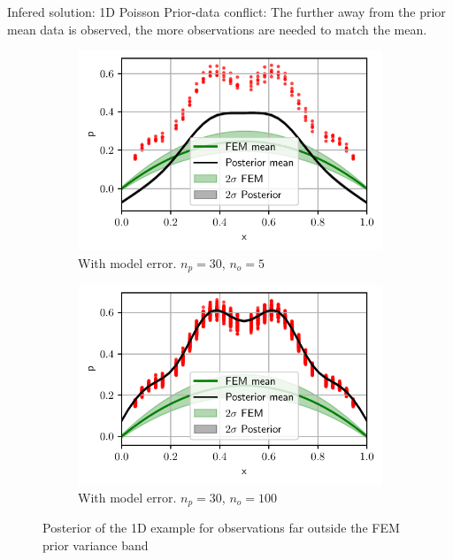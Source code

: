 \documentclass[fleqn,11pt,aspectratio=43]{beamer}
\begin{document}
	
\begin{frame}{Infered solution: 1D Poisson}
Prior-data conflict: The further away from the prior mean data is observed, the more observations are needed to match the mean.
\begin{figure}[!ht]
\centering
	\begin{subfigure}[t]{.5\textwidth}
	\centering
	\includegraphics[width=1\linewidth]{../../Python/Results/1D/PriorDataConflict/Model_Error/30s_5o/Result.pdf}
	\caption{With model error. $n_p=30$, $n_o=5$}
		\label{fig:1DConflicta}
	\end{subfigure}%
	\begin{subfigure}[t]{.5\textwidth}
	\centering
	\includegraphics[width=1\linewidth]{../../Python/Results/1D/PriorDataConflict/Model_Error/30s_100o/Result.pdf}
\centering
\caption{With model error. $n_p=30$, $n_o=100$ }
\label{fig:1DConflictb}
	\end{subfigure}
	
\caption{Posterior of the 1D example for observations far outside the FEM prior variance band}
\label{fig:1DConflict}
\end{figure}

	\end{frame}	
	
\end{document}
